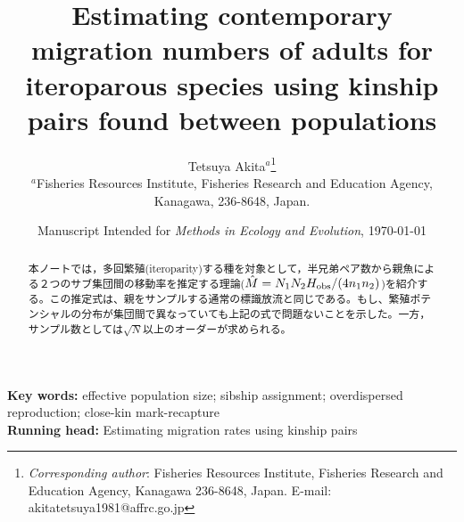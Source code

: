 \documentclass[12pt, English]{article}
\begin{document}
\title{Estimating contemporary migration numbers of adults for iteroparous species using kinship pairs found between populations}
\author{
Tetsuya Akita$^{a}$\thanks{
\emph{Corresponding author}:
    Fisheries Resources Institute, Fisheries Research and Education Agency, Kanagawa 236-8648, Japan.
    E-mail: akitatetsuya1981@affrc.go.jp} \\ 
   \small $^{a}$Fisheries Resources Institute, Fisheries Research and Education Agency, \\
   \small Kanagawa, 236-8648, Japan.
   }
\date{Manuscript Intended for \emph{Methods in Ecology and Evolution}, \today}
\maketitle

\begin{abstract}
本ノートでは，多回繁殖(iteroparity)する種を対象として，半兄弟ペア数から親魚による２つのサブ集団間の移動率を推定する理論($\hat{M}=N_1N_2H_{\rm obs}/(4n_1n_2)$)を紹介する。この推定式は、親をサンプルする通常の標識放流と同じである。もし、繁殖ポテンシャルの分布が集団間で異なっていても上記の式で問題ないことを示した。一方，サンプル数としては$\sqrt {N}$以上のオーダーが求められる。
\\
\end{abstract}
\textbf{Key words:} effective population size; sibship assignment; overdispersed reproduction; close-kin mark-recapture\\
\textbf{Running head:} Estimating migration rates using kinship pairs\\
\end{document}
